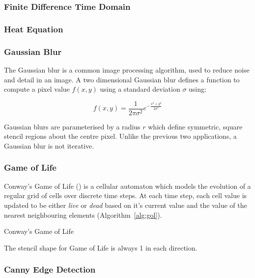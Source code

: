 
\subsubsection{Finite Difference Time Domain}

\subsubsection{Heat Equation}

\subsubsection{Gaussian Blur}

The Gaussian blur is a common image processing algorithm, used to
reduce noise and detail in an image. A two dimensional Gaussian blur
defines a function to compute a pixel value $f(x,y)$ using a standard
deviation $\sigma$ using:

\begin{equation}
f(x,y) = \frac{1}{2\pi\sigma^2}e^{-\frac{x^2 + y^2}{2\sigma^2}}
\end{equation}

Gaussian blurs are parameterised by a radius $r$ which define
symmetric, square stencil regions about the centre
pixel.  Unlike the
previous two applications, a Gaussian blur is not iterative.

\subsubsection{Game of Life}

Conway's Game of Life () is a cellular
automaton which models the evolution of a regular grid of cells over
discrete time steps. At each time step, each cell value is updated to
be either \emph{live} or \emph{dead} based on it's current value and
the value of the nearest neighbouring elements
(Algorithm~\ref{alg:gol}).

\begin{algorithm}[b]
\caption{Conway's Game of Life}
\label{alg:gol}

\end{algorithm}

The stencil shape for Game of Life is always 1 in each direction.

\subsubsection{Canny Edge Detection}

